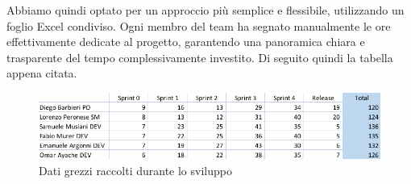 \documentclass{article}
\begin{document}
Abbiamo quindi optato per un approccio più semplice e flessibile, utilizzando un foglio Excel condiviso. Ogni membro del team ha segnato manualmente 
le ore effettivamente dedicate al progetto, garantendo una panoramica chiara e trasparente del tempo complessivamente investito. Di seguito quindi 
la tabella appena citata.

\begin{figure}[H]
    \centering
    \includegraphics[width=1\textwidth]{report-logging_raw}
    \caption{Dati grezzi raccolti durante lo sviluppo}
    \label{fig:logging}
\end{figure}
\end{document}
